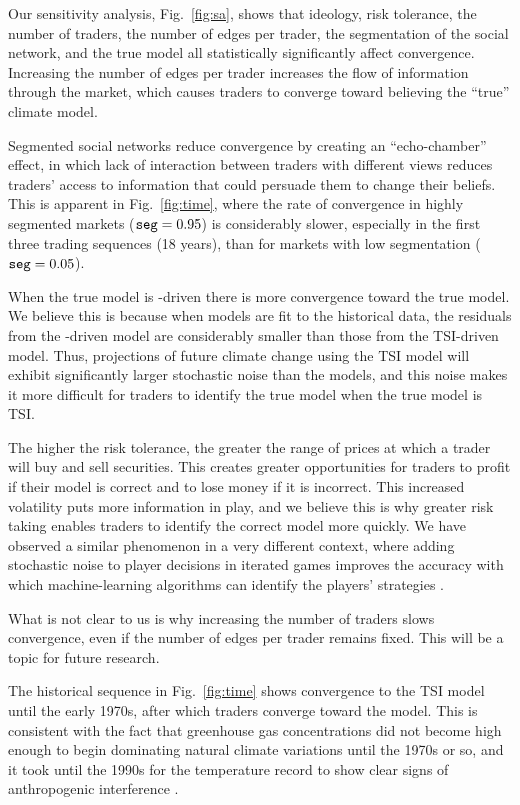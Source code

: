 \documentclass{wscpaperproc}\usepackage[]{graphicx}\usepackage[]{color}
\begin{document}
Our sensitivity analysis, Fig.~\ref{fig:sa}, shows that ideology, risk tolerance, the number of traders, the number of edges per trader, the segmentation of the social network, and the true model all statistically significantly affect convergence.  Increasing the number of edges per trader increases the flow of information through the market, which causes traders to converge toward believing the ``true'' climate model.

Segmented social networks reduce convergence by creating an ``echo-chamber'' effect, in which lack of interaction between traders with different views reduces traders' access to information that could persuade them to change their beliefs. This is apparent in Fig.~\ref{fig:time}, where the rate of convergence in highly segmented markets ($\text{\texttt{seg}} = 0.95$) is considerably slower, especially in the first three trading sequences (18 years), than for markets with low segmentation ($\text{\texttt{seg}} = 0.05$).

When the true model is -driven there is more convergence toward the true model. We believe this is because when models are fit to the historical data, the residuals from the -driven model are considerably smaller than those from the TSI-driven model. Thus, projections of future climate change using the TSI model will exhibit significantly larger stochastic noise than the  models, and this noise makes it more difficult for traders to identify the true model when the true model is TSI.

The higher the risk tolerance, the greater the range of prices at which a trader will buy and sell securities. This creates greater opportunities for traders to profit if their model is correct and to lose money if it is incorrect. This increased volatility puts more information in play, and we believe this is why greater risk taking enables traders to identify the correct model more quickly. We have observed a similar phenomenon in a very different context, where adding stochastic noise to player decisions in iterated games improves the accuracy with which machine-learning algorithms can identify the players' strategies .

What is not clear to us is why increasing the number of traders slows convergence, even if the number of edges per trader remains fixed. This will be a topic for future research.

The historical sequence in Fig.~\ref{fig:time} shows convergence to the TSI model until the early 1970s, after which traders converge toward the  model. This is consistent with the fact that greenhouse gas concentrations did not become high enough to begin dominating natural climate variations until the 1970s or so, and it took until the 1990s for the temperature record to show clear signs of anthropogenic interference .
\end{document}
